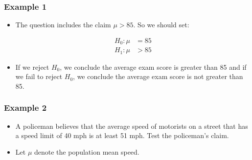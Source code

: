 \documentclass[12pt]{beamer}
\begin{document}
\begin{frame}
	\frametitle{Example 1}
	
	\begin{itemize}[label={\color{blue}$\blacktriangleright$}]
		\item The question includes the claim $\mu > 85$. So we should set:
		
		\begin{align*}
			H_0 : \mu &= 85 \\
			H_1 : \mu &> 85
		\end{align*}
		
		\item If we reject $H_0$, we conclude the average exam score is greater than 85 and if we fail to reject $H_0$, we conclude the average exam score is not greater than 85.
	\end{itemize}
	
\end{frame}

\begin{frame}
	\frametitle{Example 2}
	
	\begin{itemize}[label={\color{blue}$\blacktriangleright$}]
		\item A policeman believes that the average speed of motorists on a street that has a speed limit of 40 mph is at least 51 mph. Test the policeman's claim.
		
		\item Let $\mu$ denote the population mean speed.
	\end{itemize}
	
\end{frame}
\end{document}
